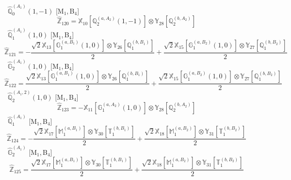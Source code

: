 \documentclass[fleqn,10pt,landscape]{article}
\begin{document}
\begin{itemize}
\begin{dmath*}
\end{dmath*}
\vspace{4mm}
\noindent {} $\,\,\,\hat{\mathbb{Q}}_{0}^{(A_{1})}(1,-1)$ [M$_{1}$,\,B$_{4}$]
\begin{dmath*}
\hat{\mathbb{Z}}_{120}=\mathbb{X}_{10}[\mathbb{Q}_{2}^{(a,A_{2})}(1,-1)] \otimes\mathbb{Y}_{28}[\mathbb{Q}_{2}^{(b,A_{2})}]
\end{dmath*}
\vspace{4mm}
\noindent {} $\,\,\,\hat{\mathbb{Q}}_{1}^{(A_{1})}(1,0)$ [M$_{1}$,\,B$_{4}$]
\begin{dmath*}
\hat{\mathbb{Z}}_{121}=- \frac{\sqrt{2} \mathbb{X}_{13}[\mathbb{G}_{1}^{(a,B_{1})}(1,0)] \otimes\mathbb{Y}_{26}[\mathbb{Q}_{1}^{(b,B_{1})}]}{2} + \frac{\sqrt{2} \mathbb{X}_{15}[\mathbb{G}_{1}^{(a,B_{2})}(1,0)] \otimes\mathbb{Y}_{27}[\mathbb{Q}_{1}^{(b,B_{2})}]}{2}
\end{dmath*}
\vspace{4mm}
\noindent {} $\,\,\,\hat{\mathbb{G}}_{2}^{(A_{1})}(1,0)$ [M$_{1}$,\,B$_{4}$]
\begin{dmath*}
\hat{\mathbb{Z}}_{122}=\frac{\sqrt{2} \mathbb{X}_{13}[\mathbb{G}_{1}^{(a,B_{1})}(1,0)] \otimes\mathbb{Y}_{26}[\mathbb{Q}_{1}^{(b,B_{1})}]}{2} + \frac{\sqrt{2} \mathbb{X}_{15}[\mathbb{G}_{1}^{(a,B_{2})}(1,0)] \otimes\mathbb{Y}_{27}[\mathbb{Q}_{1}^{(b,B_{2})}]}{2}
\end{dmath*}
\vspace{4mm}
\noindent {} $\,\,\,\hat{\mathbb{Q}}_{2}^{(A_{1},2)}(1,0)$ [M$_{1}$,\,B$_{4}$]
\begin{dmath*}
\hat{\mathbb{Z}}_{123}=- \mathbb{X}_{11}[\mathbb{G}_{1}^{(a,A_{2})}(1,0)] \otimes\mathbb{Y}_{28}[\mathbb{Q}_{2}^{(b,A_{2})}]
\end{dmath*}
\vspace{4mm}
\noindent {} $\,\,\,\hat{\mathbb{Q}}_{1}^{(A_{1})}$ [M$_{1}$,\,B$_{4}$]
\begin{dmath*}
\hat{\mathbb{Z}}_{124}=- \frac{\sqrt{2} \mathbb{X}_{17}[\mathbb{M}_{1}^{(a,B_{1})}] \otimes\mathbb{Y}_{30}[\mathbb{T}_{1}^{(b,B_{1})}]}{2} + \frac{\sqrt{2} \mathbb{X}_{18}[\mathbb{M}_{1}^{(a,B_{2})}] \otimes\mathbb{Y}_{31}[\mathbb{T}_{1}^{(b,B_{2})}]}{2}
\end{dmath*}
\vspace{4mm}
\noindent {} $\,\,\,\hat{\mathbb{G}}_{2}^{(A_{1})}$ [M$_{1}$,\,B$_{4}$]
\begin{dmath*}
\hat{\mathbb{Z}}_{125}=\frac{\sqrt{2} \mathbb{X}_{17}[\mathbb{M}_{1}^{(a,B_{1})}] \otimes\mathbb{Y}_{30}[\mathbb{T}_{1}^{(b,B_{1})}]}{2} + \frac{\sqrt{2} \mathbb{X}_{18}[\mathbb{M}_{1}^{(a,B_{2})}] \otimes\mathbb{Y}_{31}[\mathbb{T}_{1}^{(b,B_{2})}]}{2}

\end{dmath*}
\end{itemize}
\end{document}
